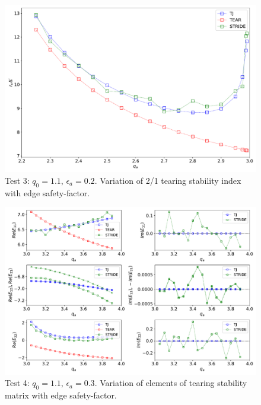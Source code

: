 \documentclass[12pt,prb,aps,notitlepage]{revtex4-1}
\begin{document}
\begin{figure}
\centerline{\includegraphics[width=\textwidth]{Test3.pdf}}
\caption{Test 3:  $q_0=1.1$, $\epsilon_a=0.2$. Variation of 2/1 tearing stability index with edge safety-factor.}
\end{figure}

\begin{figure}
\centerline{\includegraphics[width=\textwidth]{Test4.pdf}}
\caption{Test 4:  $q_0=1.1$, $\epsilon_a=0.3$. Variation of elements of tearing stability matrix with edge safety-factor.}
\end{figure}
\end{document}
